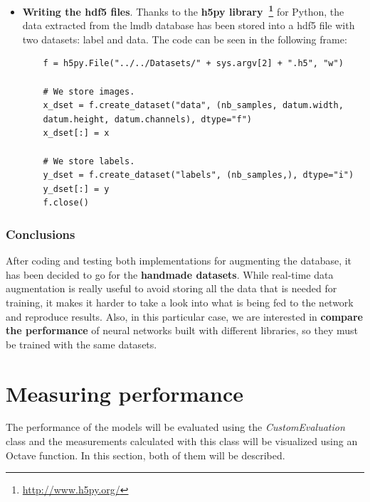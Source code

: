 \begin{itemize}
\begin{lstlisting}
		x.append(im)
		y.append(label)
		nb_samples += 1
		
		print("Extracted samples: " + str(nb_samples) + "\n")
	
	x = np.asarray(x)
	y = np.asarray(y)
\end{lstlisting}
	
	\item \textbf{Writing the \gls{hdf5} files}. Thanks to the \textbf{h5py library~\footnote{\url{http://www.h5py.org/}}} for Python, the data extracted from the \gls{lmdb} database has been stored into a \gls{hdf5} file with two datasets: label and data. The code can be seen in the following frame:	 
	\begin{lstlisting}
	f = h5py.File("../../Datasets/" + sys.argv[2] + ".h5", "w")
	
	# We store images.
	x_dset = f.create_dataset("data", (nb_samples, datum.width,
	datum.height, datum.channels), dtype="f")
	x_dset[:] = x
	
	# We store labels.
	y_dset = f.create_dataset("labels", (nb_samples,), dtype="i")
	y_dset[:] = y
	f.close()
	\end{lstlisting}
\end{itemize} 

\subsubsection{Conclusions}
After coding and testing both implementations for augmenting the database, it has been decided to go for the \textbf{handmade datasets}. While real-time data augmentation is really useful to avoid storing all the data that is needed for training, it makes it harder to take a look into what is being fed to the network and reproduce results. Also, in this particular case, we are interested in \textbf{compare the performance} of neural networks built with different libraries, so they must be trained with the same datasets.

\section{Measuring performance}\label{sec:measuring}
The performance of the models will be evaluated using the \textit{CustomEvaluation} class and the measurements calculated with this class will be visualized using an Octave function. In this section, both of them will be described.

